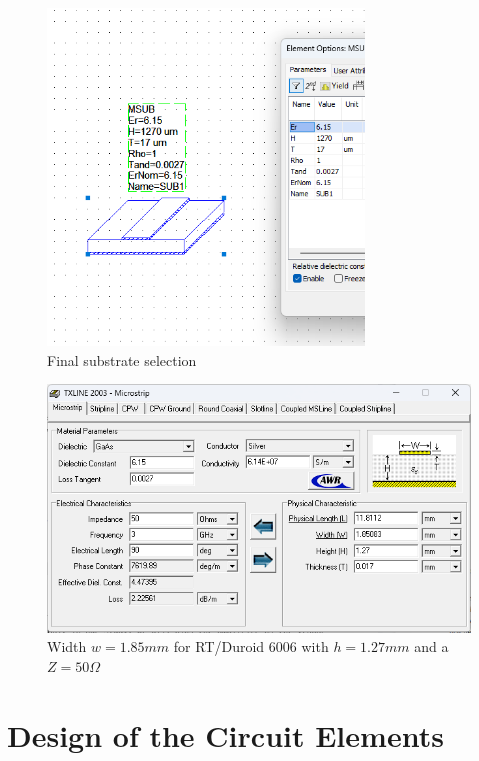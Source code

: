 \documentclass[12pt]{report} %
\begin{document}
\begin{figure}[htbp]
    \centering
    \includegraphics[width=0.75\textwidth]{images/previous_work/final_substrate_duroid_6006_h_1_27_mm.png}
    \caption{Final substrate selection}
    \label{fig:previous_work:final_substrate}
\end{figure}

\begin{figure}[htbp]
    \centering
    \includegraphics[width=\textwidth]{images/previous_work/txline_tool_duroid_6006_h_1_27_mm_50_ohm.png}
    \caption{Width $w = 1.85 mm$ for RT/Duroid 6006 with $h = 1.27 mm$ and a $Z = 50 \Omega$}
    \label{fig:previous_work:duroid_6006_h_1_27_mm_50_ohm}
\end{figure}

\chapter{Design of the Circuit Elements}
\end{document}
